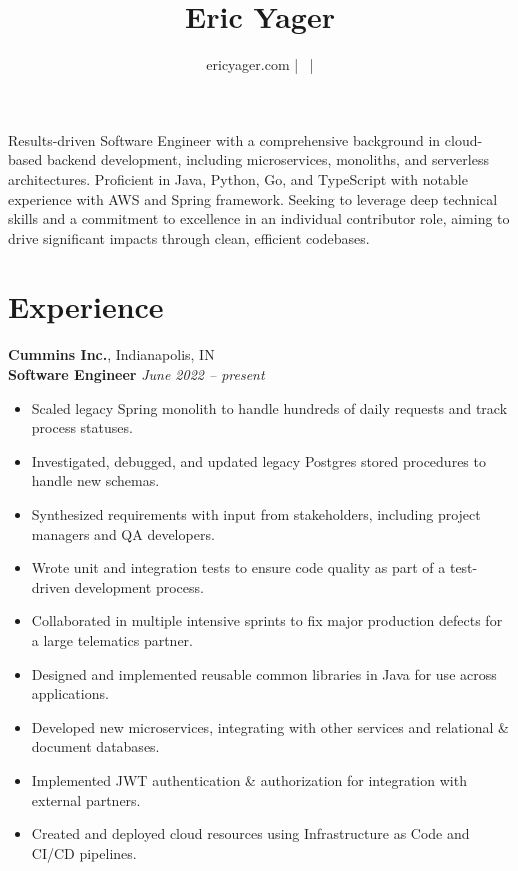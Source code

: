 \documentclass[11pt,letterpaper]{article}
\title{Eric Yager}
\author{ericyager.com | \myEmail\ | \myPhoneNumber}
\date{}
\begin{document}
\maketitle

\vspace{-1em}
Results-driven Software Engineer with a comprehensive background in cloud-based backend development,
including microservices, monoliths, and serverless architectures. Proficient in Java, Python, Go, and TypeScript
with notable experience with AWS and Spring framework. Seeking to leverage deep technical skills and a
commitment to excellence in an individual contributor role, aiming to drive significant impacts through clean,
efficient codebases.

\section*{Experience}

\noindent\textbf{Cummins Inc.}, Indianapolis, IN\\
\noindent\textbf{Software Engineer} \hfill \textit{June 2022 -- present}
\begin{itemize}
    \item Scaled legacy Spring monolith to handle hundreds of daily requests and track process statuses.
    \item Investigated, debugged, and updated legacy Postgres stored procedures to handle new schemas.
    \item Synthesized requirements with input from stakeholders, including project managers and QA developers.
    \item Wrote unit and integration tests to ensure code quality as part of a test-driven development process.
    \item Collaborated in multiple intensive sprints to fix major production defects for a large telematics partner.
    \item Designed and implemented reusable common libraries in Java for use across applications.
    \item Developed new microservices, integrating with other services and relational \& document databases.
    \item Implemented JWT authentication \& authorization for integration with external partners.
    \item Created and deployed cloud resources using Infrastructure as Code and CI/CD pipelines.
\end{itemize}
\end{document}
